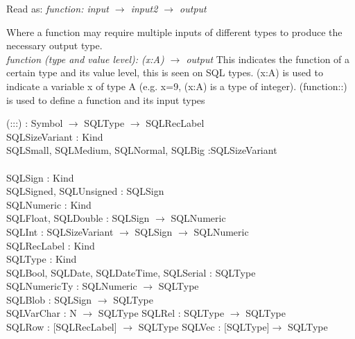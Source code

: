\documentclass[12pt, svgnames]{article}
\begin{document}
{{Read as: \textit{function: input $\rightarrow$ input2 $\rightarrow$ 
output}\newline

Where a function may require multiple inputs of different types to produce the 
necessary output type.\\

\textit{function (type and value level): (x:A) $\rightarrow$ output}
This indicates the function of a certain type and its value level, this is seen 
on SQL types. (x:A) is used to indicate a variable x of type A (e.g. x=9, (x:A) 
is a type of integer). (function::) is used to define a function and its input 
types 




 (:::) : Symbol $\rightarrow$ SQLType $\rightarrow$ SQLRecLabel \\
 
 SQLSizeVariant : Kind \\
 SQLSmall, SQLMedium, SQLNormal, SQLBig :SQLSizeVariant \\ \\
 
 SQLSign : Kind \\
 SQLSigned, SQLUnsigned : SQLSign  \\
 
 SQLNumeric : Kind \\
 SQLFloat, SQLDouble : SQLSign $\rightarrow$ SQLNumeric \\
 
 SQLInt : SQLSizeVariant $\rightarrow$ SQLSign $\rightarrow$ SQLNumeric \\
 SQLRecLabel : Kind \\

 SQLType : Kind \\
 SQLBool, SQLDate, SQLDateTime, SQLSerial : SQLType \\
 
 SQLNumericTy : SQLNumeric $\rightarrow$ SQLType  \\
 SQLBlob : SQLSign $\rightarrow$ SQLType \\
 
 SQLVarChar : N $\rightarrow$ SQLType 
 SQLRel : SQLType $\rightarrow$ SQLType \\
 
 SQLRow : [SQLRecLabel] $\rightarrow$ SQLType 
 SQLVec : [SQLType]$\rightarrow$ SQLType \\
 
}}
\end{document}
